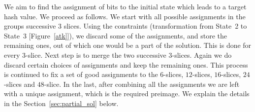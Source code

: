 \documentclass[runningheads]{llncs}
\begin{document}
 We aim to find the assignment of bits to the initial state which leads to a target hash value. We proceed as follows. We start with all possible assignments in the groups successive $3$ slices. Using the constraints (transformation from State~2 to State~3 [Figure~\ref{atk}]), we discard some of the assignments, and store the remaining ones, out of which one would be a part of the solution. This is done for every $3$-slice. Next step is to merge the two successive $3$-slices. Again we do discard certain choices of assignments and keep the remaining ones. This process is continued to fix a set of good assignments to the $6$-slices, $12$-slices, $16$-slices, $24$-slices and $48$-slice. In the last, after combining all the assignments we are left with a unique assignment, which is the required preimage. We explain the details in the Section~\ref{sec:partial_sol} below. 
\end{document}
